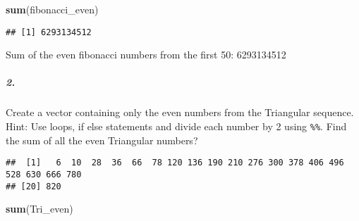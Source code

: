 \documentclass[
]{article}
\newenvironment{Shaded}{\begin{snugshade}}{\end{snugshade}}
\newcommand{\CommentTok}[1]{\textcolor[rgb]{0.56,0.35,0.01}{\textit{#1}}}
\newcommand{\ControlFlowTok}[1]{\textcolor[rgb]{0.13,0.29,0.53}{\textbf{#1}}}
\newcommand{\DecValTok}[1]{\textcolor[rgb]{0.00,0.00,0.81}{#1}}
\newcommand{\KeywordTok}[1]{\textcolor[rgb]{0.13,0.29,0.53}{\textbf{#1}}}
\newcommand{\NormalTok}[1]{#1}
\newcommand{\OperatorTok}[1]{\textcolor[rgb]{0.81,0.36,0.00}{\textbf{#1}}}
\newcommand{\StringTok}[1]{\textcolor[rgb]{0.31,0.60,0.02}{#1}}
\begin{document}
\begin{Shaded}
\begin{Highlighting}[]
\KeywordTok{sum}\NormalTok{(fibonacci_even)}
\end{Highlighting}
\end{Shaded}

\begin{verbatim}
## [1] 6293134512
\end{verbatim}

Sum of the even fibonacci numbers from the first 50: 6293134512

\hypertarget{section-1}{%
\subparagraph{2.}\label{section-1}}

Create a vector containing only the even numbers from the Triangular
sequence. Hint: Use loops, if else statements and divide each number by
2 using \texttt{\%\%}. Find the sum of all the even Triangular numbers?

\begin{Shaded}
\end{Shaded}

\begin{verbatim}
##  [1]   6  10  28  36  66  78 120 136 190 210 276 300 378 406 496 528 630 666 780
## [20] 820
\end{verbatim}

\begin{Shaded}
\begin{Highlighting}[]
\KeywordTok{sum}\NormalTok{(Tri_even)}
\end{Highlighting}
\end{Shaded}
\end{document}
